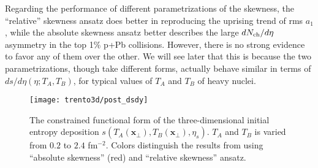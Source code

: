 Regarding the performance of different parametrizations of the skewness, the ``relative'' skewness ansatz does better in reproducing the uprising trend of rms $a_1$, while the absolute skewness ansatz better describes the large $dN_\text{ch}/d\eta$ asymmetry in the top 1\% p+Pb collisions.
However, there is no strong evidence to favor any of them over the other.
We will see later that this is because the two parametrizations, though take different forms, actually behave similar in terms of $ds/d\eta(\eta; T_A, T_B)$, for typical values of $T_A$ and $T_B$ of heavy nuclei.

\begin{figure}
\singlespacing 
\centering
\texttt{[image: trento3d/post\_dsdy]}
\caption[The constrained functional form of the three-dimensional initial]{The constrained functional form of the three-dimensional initial entropy deposition $s(T_A(\mathbf{x}_\perp), T_B(\mathbf{x}_\perp), \eta_s)$. $T_A$ and $T_B$ is varied from $0.2$ to $2.4$ fm${}^{-2}$. Colors distinguish the results from using ``absolute skewness'' (red) and ``relative skewness'' ansatz.}
\label{fig:trento:post_dsdy}
\end{figure}

